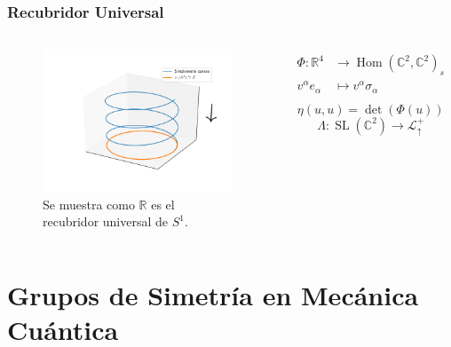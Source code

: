 \documentclass{beamer}
\DeclareMathOperator{\SL}{SL}
\DeclareMathOperator{\Hom}{Hom}
\begin{document}
\begin{frame}[fragile]
\frametitle{Recubridor Universal}
\begin{columns}
\begin{figure}
\centering
\includegraphics[width=\textwidth]{helice.png}
\caption{Se muestra como $\mathbb{R}$ es el recubridor universal de $S^1$.}
\end{figure}
\begin{align}
\begin{split}
\Phi:\mathbb{R}^4&\rightarrow \Hom(\mathbb{C}^2,\mathbb{C}^2)_s \\
v^\alpha e_\alpha&\mapsto v^\alpha\sigma_\alpha \\
\end{split}
\end{align}
\begin{equation}
\eta(u,u)=\det(\Phi(u))
\end{equation}
\begin{equation}
\Lambda:\SL(\mathbb{C}^2)\rightarrow \mathcal{L}^+_\uparrow
\end{equation}
\end{columns}
\end{frame}

\section{Grupos de Simetría en Mecánica Cuántica}
\end{document}

